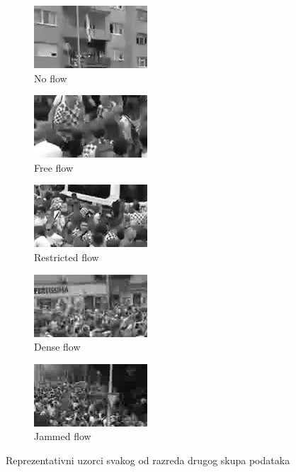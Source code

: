 \documentclass[times, utf8, zavrsni]{fer}
\begin{document}
\begin{figure}[ht]
	\begin{subfigure}[b]{0.19\linewidth}
		\centering
		\includegraphics[scale=0.4]{img/noflow2.jpg}
		\caption{No flow}
	\end{subfigure}
	\begin{subfigure}[b]{0.19\linewidth}
		\centering
		\includegraphics[scale=0.4]{img/freeflow2.jpg}
		\caption{Free flow}
	\end{subfigure}
	\begin{subfigure}[b]{0.19\linewidth}
		\centering
		\includegraphics[scale=0.4]{img/restrictedflow2.jpg}
		\caption{Restricted flow}
	\end{subfigure}
	\begin{subfigure}[b]{0.19\linewidth}
		\centering
		\includegraphics[scale=0.4]{img/denseflow2.jpg}
		\caption{Dense flow}
	\end{subfigure}
	\begin{subfigure}[b]{0.19\linewidth}
		\centering
		\includegraphics[scale=0.4]{img/jammedflow2.jpg}
		\caption{Jammed flow}
	\end{subfigure}
\caption{Reprezentativni uzorci svakog od razreda drugog skupa podataka}
\end{figure}
\end{document}
